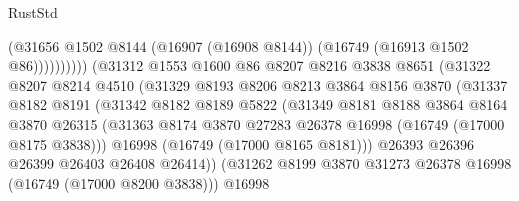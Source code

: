 \begin{lexlean}{RustStd}
\begin{coremodule}
                                        (@31656
                                          @1502
                                          @8144
                                          (@16907 (@16908 @8144))
                                          (@16749 (@16913 @1502 @86))))))))))
                          (@31312
                            @1553
                            @1600
                            @86
                            @8207
                            @8216
                            @3838
                            @8651
                            (@31322
                              @8207
                              @8214
                              @4510
                              (@31329
                                @8193
                                @8206
                                @8213
                                @3864
                                @8156
                                @3870
                                (@31337
                                  @8182
                                  @8191
                                  (@31342
                                    @8182
                                    @8189
                                    @5822
                                    (@31349
                                      @8181
                                      @8188
                                      @3864
                                      @8164
                                      @3870
                                      @26315
                                      (@31363
                                        @8174
                                        @3870
                                        @27283
                                        @26378
                                        @16998
                                        (@16749 (@17000 @8175 @3838)))
                                      @16998
                                      (@16749 (@17000 @8165 @8181)))
                                    @26393
                                    @26396
                                    @26399
                                    @26403
                                    @26408
                                    @26414))
                                (@31262
                                  @8199
                                  @3870
                                  @31273
                                  @26378
                                  @16998
                                  (@16749 (@17000 @8200 @3838)))
                                @16998

\end{coremodule}
\end{lexlean}
